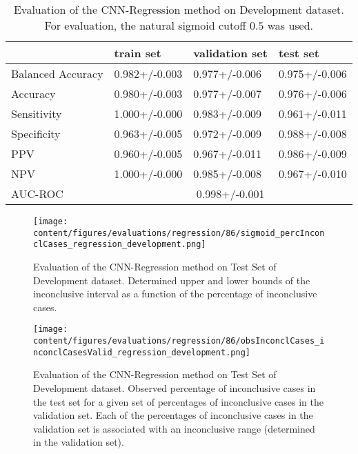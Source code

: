 \begin{table}[ht]
  \caption{Evaluation of the CNN-Regression method on Development dataset. 
  For evaluation, the natural sigmoid cutoff $0.5$ was used.}
  \centering
  \begin{tabular}{llll}
      \hline
                        & train set         & validation set      & test set             \\
      \hline
      Balanced Accuracy & 0.982+/-0.003   &  0.977+/-0.006    &  0.975+/-0.006 \\
      Accuracy          & 0.980+/-0.003     &   0.977+/-0.007   &  0.976+/-0.006  \\
      Sensitivity       &  1.000+/-0.000   &   0.983+/-0.009   &  0.961+/-0.011 \\
      Specificity       &   0.963+/-0.005  &   0.972+/-0.009 &   0.988+/-0.008 \\
      PPV               &  0.960+/-0.005    &   0.967+/-0.011  &  0.986+/-0.009  \\
      NPV               &  1.000+/-0.000  &   0.985+/-0.008   & 0.967+/-0.010 \\
      \hline
      AUC-ROC          &  \multicolumn{3}{c}{0.998+/-0.001}  \\
      \hline
  \end{tabular}
 \label{t1:cnn_regression_perf_eval_table}
\end{table}


\begin{figure}[t]
  \centering
  \texttt{[image: content/figures/evaluations/regression/86/sigmoid\_percInconclCases\_regression\_development.png]}
  \caption{Evaluation of the CNN-Regression method on Test Set of Development dataset. 
  Determined upper and lower bounds of the inconclusive interval as a function of the percentage of inconclusive cases.} 
  \label{fig:regression_percInconclCases_development}
\end{figure}


\begin{figure}[h]
  \centering
  \texttt{[image: content/figures/evaluations/regression/86/obsInconclCases\_inconclCasesValid\_regression\_development.png]}
  \caption{Evaluation of the CNN-Regression method on Test Set of Development dataset.
  Observed percentage of inconclusive cases in the test set 
  for a given set of percentages of inconclusive cases in the validation set.
  Each of the percentages of inconclusive cases in the validation set is associated 
  with an inconclusive range (determined in the validation set).} 
  \label{fig:obsInconclCases_inconclCasesValid_regression_development}
\end{figure} 


